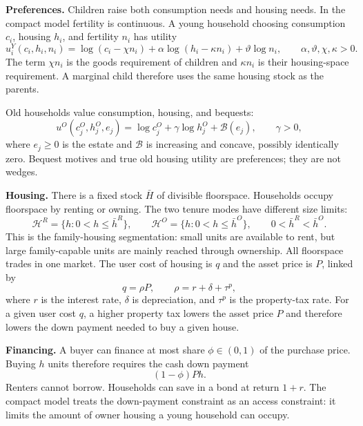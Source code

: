 \documentclass[11pt]{article}
\newcommand{\1}{\mathbf 1}
\newcommand{\HH}{\mathcal H}
\newcommand{\Bcal}{\mathcal B}
\begin{document}
\textbf{Preferences.} Children raise both consumption needs and housing needs.
In the compact model fertility is continuous. A young household choosing
consumption $c_i$, housing $h_i$, and fertility $n_i$ has utility
\begin{equation}
u_i^Y(c_i,h_i,n_i)
=
\log(c_i-\chi n_i)+\alpha\log(h_i-\kappa n_i)+\vartheta\log n_i,
\qquad
\alpha,\vartheta,\chi,\kappa>0.
\label{eq:compact_young_utility}
\end{equation}
The term $\chi n_i$ is the goods requirement of children and $\kappa n_i$ is
their housing-space requirement. A marginal child therefore uses the same
housing stock as the parents.

Old households value consumption, housing, and bequests:
\begin{equation}
u^O(c_j^O,h_j^O,e_j)
=
\log c_j^O+\gamma\log h_j^O+\Bcal(e_j),
\qquad
\gamma>0,
\label{eq:compact_old_utility}
\end{equation}
where $e_j\ge0$ is the estate and $\Bcal$ is increasing and concave, possibly
identically zero. Bequest motives and true old housing utility are preferences;
they are not wedges.

\textbf{Housing.} There is a fixed stock $\bar H$ of divisible floorspace.
Households occupy floorspace by renting or owning. The two tenure modes have
different size limits:
\begin{equation}
\HH^R=\{h:0<h\le \bar h^R\},
\qquad
\HH^O=\{h:0<h\le \bar h^O\},
\qquad
0<\bar h^R<\bar h^O.
\label{eq:compact_size_sets}
\end{equation}
This is the family-housing segmentation: small units are available to rent, but
large family-capable units are mainly reached through ownership. All floorspace
trades in one market. The user cost of housing is $q$ and the asset price is
$P$, linked by
\begin{equation}
q=\rho P,
\qquad
\rho=r+\delta+\tau^p,
\label{eq:compact_user_cost}
\end{equation}
where $r$ is the interest rate, $\delta$ is depreciation, and $\tau^p$ is the
property-tax rate. For a given user cost $q$, a higher property tax lowers the
asset price $P$ and therefore lowers the down payment needed to buy a given
house.

\textbf{Financing.} A buyer can finance at most share $\phi\in(0,1)$ of the
purchase price. Buying $h$ units therefore requires the cash down payment
\begin{equation}
    (1-\phi)Ph.
\label{eq:compact_down_payment}
\end{equation}
Renters cannot borrow. Households can save in a bond at return $1+r$. The
compact model treats the down-payment constraint as an access constraint: it
limits the amount of owner housing a young household can occupy.
\end{document}

